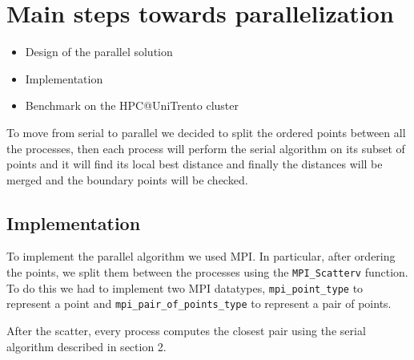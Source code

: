 \section{Main steps towards parallelization}
\label{sec:parallelization}

\begin{itemize}
  \item Design of the parallel solution
  \item Implementation
  \item Benchmark on the HPC@UniTrento cluster
\end{itemize}

To move from serial to parallel we decided to split the ordered
points between all the processes, then each process will perform
the serial algorithm on its subset of points and it will find its local best distance and
finally the distances will be merged and the boundary points will be checked.

\subsection*{Implementation}
To implement the parallel algorithm we used MPI.
In particular, after ordering the points, we split them between the processes using the \verb+MPI_Scatterv+ function.
To do this we had to implement two MPI datatypes, \verb+mpi_point_type+ to represent a point and \verb+mpi_pair_of_points_type+
to represent a pair of points.

After the scatter, every process computes the closest pair using the serial algorithm described in section 2.
